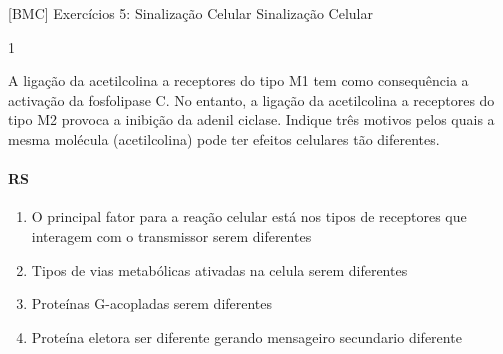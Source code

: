 \documentclass[\mainfilename]{subfiles}
\begin{document}
[BMC]
{Exercícios 5: Sinalização Celular} %
{Sinalização Celular} %


\begin{questionBox}1{} %
    
    A ligação da acetilcolina a receptores do tipo M1 tem como consequência a activação da fosfolipase C. No entanto, a ligação da acetilcolina a receptores do tipo M2 provoca a inibição da adenil ciclase. Indique três motivos pelos quais a mesma molécula (acetilcolina) pode ter efeitos celulares tão diferentes.

    \paragraph*{RS}
    \begin{enumerate}
        \item O principal fator para a reação celular está nos tipos de receptores que interagem com o transmissor serem diferentes
        \item Tipos de vias metabólicas ativadas na celula serem diferentes
        \item Proteínas G-acopladas serem diferentes
        \item Proteína eletora ser diferente gerando mensageiro secundario diferente
    \end{enumerate}
    
\end{questionBox}
\end{document}
